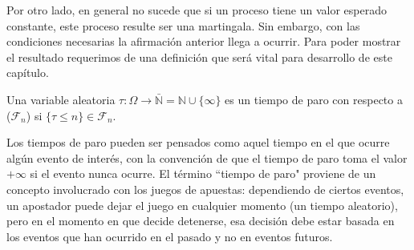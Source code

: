 Por otro lado, en general no sucede que si un proceso tiene un valor esperado constante, este proceso resulte ser una martingala. Sin embargo, con las condiciones necesarias la afirmación anterior llega a ocurrir. Para poder mostrar el resultado requerimos de una definición que será vital para desarrollo de este capítulo.

\begin{definition}
Una variable aleatoria $\tau: \Omega \rightarrow \bar{\mathbb{N}} = \mathbb{N} \cup \{ \infty \}$ es un tiempo de paro con respecto a ($\mathcal{F}_n$) si $\{ \tau \leq n \} \in \mathcal{F}_n$.
\end{definition}

Los tiempos de paro pueden ser pensados como aquel tiempo en el que ocurre algún evento de interés, con la convención de que el tiempo de paro toma el valor $+ \infty$ si el evento nunca ocurre. El término ``tiempo de paro" proviene de un concepto involucrado con los juegos de apuestas: dependiendo de ciertos eventos, un apostador puede dejar el juego en cualquier momento (un tiempo aleatorio), pero en el momento en que decide detenerse, esa decisión debe estar basada en los eventos que han ocurrido en el pasado y no en eventos futuros.

